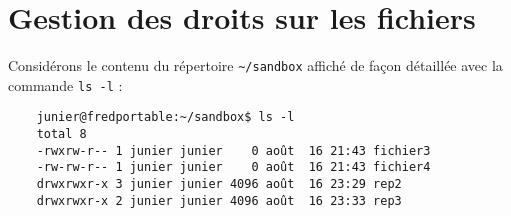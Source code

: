 \documentclass[
  11pt,
]{article}
\begin{document}
\hypertarget{gestion-des-droits-sur-les-fichiers}{%
\section{Gestion des droits sur les
fichiers}\label{gestion-des-droits-sur-les-fichiers}}

Considérons le contenu du répertoire \texttt{\textasciitilde{}/sandbox}
affiché de façon détaillée avec la commande \texttt{ls\ -l} :

\begin{verbatim}
    junier@fredportable:~/sandbox$ ls -l
    total 8
    -rwxrw-r-- 1 junier junier    0 août  16 21:43 fichier3
    -rw-rw-r-- 1 junier junier    0 août  16 21:43 fichier4
    drwxrwxr-x 3 junier junier 4096 août  16 23:29 rep2
    drwxrwxr-x 2 junier junier 4096 août  16 23:33 rep3
\end{verbatim}
\end{document}
